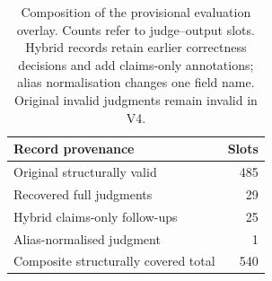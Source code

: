 \begin{table}[!htbp]
\centering
\small
\caption[Composition of the provisional evaluation overlay]{Composition of the provisional evaluation overlay. Counts refer to judge--output slots. Hybrid records retain earlier correctness decisions and add claims-only annotations; alias normalisation changes one field name. Original invalid judgments remain invalid in V4.}
\label{tab:evaluation-provenance}
\begin{tabular}{lr}
\toprule
Record provenance & Slots \\
\midrule
Original structurally valid & 485 \\
Recovered full judgments & 29 \\
Hybrid claims-only follow-ups & 25 \\
Alias-normalised judgment & 1 \\
\midrule
Composite structurally covered total & 540 \\
\bottomrule
\end{tabular}
\end{table}
